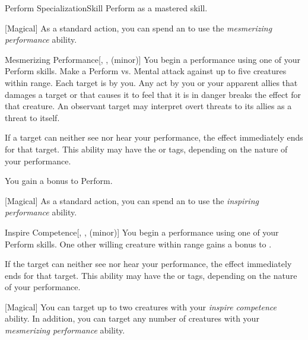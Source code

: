     \begin{feat}{Perform Specialization}{Skill}
        \featpre Perform as a mastered skill.

        [Magical] As a standard action, you can spend an  to use the \textit{mesmerizing performance} ability.
        \begin{ability}{Mesmerizing Performance}[, ,  (minor)]
            You begin a performance using one of your Perform skills.
            Make a Perform vs. Mental attack against up to five creatures within \rngmed range.
            \hit Each target is \fascinated by you.
            Any act by you or your apparent allies that damages a target or that causes it to feel that it is in danger breaks the effect for that creature.
            An observant target may interpret overt threats to its allies as a threat to itself.

            If a target can neither see nor hear your performance, the effect immediately ends for that target.
            This ability may have the  or  tags, depending on the nature of your performance.
        \end{ability}

         You gain a  bonus to Perform.

        [Magical] As a standard action, you can spend an  to use the \textit{inspiring performance} ability.
        \begin{ability}{Inspire Competence}[, ,  (minor)]
            You begin a performance using one of your Perform skills.
            One other willing creature within \rngmed range gains a  bonus to .

            If the target can neither see nor hear your performance, the effect immediately ends for that target.
            This ability may have the  or  tags, depending on the nature of your performance.
        \end{ability}

        [Magical] You can target up to two creatures with your \textit{inspire competence} ability.
        In addition, you can target any number of creatures with your \textit{mesmerizing performance} ability.


\end{feat}
